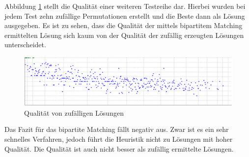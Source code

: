 Abbildung \ref{pic:RndQuali} stellt die Qualität einer weiteren Testreihe dar. Hierbei 
wurden bei jedem Test zehn zufällige Permutationen erstellt und die Beste dann als Lösung 
ausgegeben. Es ist zu sehen, dass die Qualität der mittels bipartitem Matching ermittelten 
Lösung sich kaum von der Qualität der zufällig erzeugten Lösungen unterscheidet. 

\begin{figure}[htb]
\centering
\includegraphics[width=\linewidth,height=\textheight,
keepaspectratio]{bilder/rndQuali}
\caption{Qualität von zufälligen Lösungen}
\label{pic:RndQuali}
\end{figure}

Das Fazit für das bipartite Matching fällt negativ aus. Zwar ist es ein sehr schnelles 
Verfahren, jedoch führt die Heuristik nicht zu Lösungen mit hoher Qualität. Die Qualität 
ist auch nicht besser als zufällig ermittelte Lösungen. 
